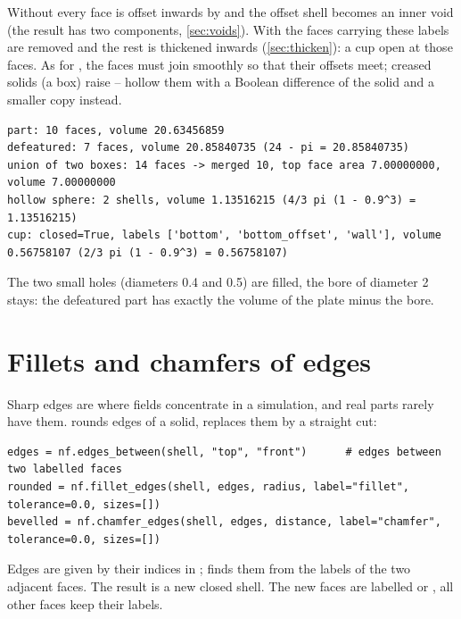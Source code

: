 Without  every face is offset inwards by  and the offset shell
becomes an inner void (the result has two components, \cref{sec:voids}). With
 the faces carrying these labels are removed and the rest is thickened
inwards (\cref{sec:thicken}): a cup open at those faces. As for , the faces must
join smoothly so that their offsets meet; creased solids (a box) raise  --
hollow them with a Boolean difference of the solid and a smaller copy instead.


\begin{lstlisting}[style=text]
part: 10 faces, volume 20.63456859
defeatured: 7 faces, volume 20.85840735 (24 - pi = 20.85840735)
union of two boxes: 14 faces -> merged 10, top face area 7.00000000, volume 7.00000000
hollow sphere: 2 shells, volume 1.13516215 (4/3 pi (1 - 0.9^3) = 1.13516215)
cup: closed=True, labels ['bottom', 'bottom_offset', 'wall'], volume 0.56758107 (2/3 pi (1 - 0.9^3) = 0.56758107)
\end{lstlisting}

The two small holes (diameters 0.4 and 0.5) are filled, the bore of diameter 2 stays: the
defeatured part has exactly the volume of the plate minus the bore.

\section{Fillets and chamfers of edges}\label{sec:edge-blends}

Sharp edges are where fields concentrate in a simulation, and real parts rarely have them.
 rounds edges of a solid,  replaces them by a
straight cut:

\begin{lstlisting}
edges = nf.edges_between(shell, "top", "front")      # edges between two labelled faces
rounded = nf.fillet_edges(shell, edges, radius, label="fillet", tolerance=0.0, sizes=[])
bevelled = nf.chamfer_edges(shell, edges, distance, label="chamfer", tolerance=0.0, sizes=[])
\end{lstlisting}

Edges are given by their indices in ;  finds them
from the labels of the two adjacent faces. The result is a new closed shell. The new faces are
labelled  or , all other faces keep their labels.

